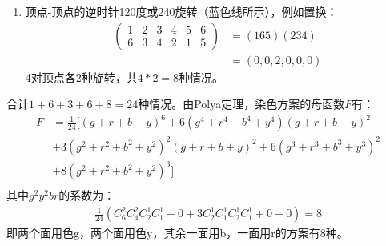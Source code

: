 \begin{solution}
\begin{enumerate}
\begin{align*}
\begin{matrix}
               1 & 2 & 3 & 4 & 5 & 6\\
               6 & 4 & 5 & 2 & 3 & 1
            \end{matrix}
            \right) &= (16)(24)(35) \\
            &= (0,3,0,0,0,0)
      \end{align*}
      6对棱，共$6$种情况。
      \item 顶点-顶点的逆时针120度或240旋转（蓝色线所示），例如置换：
      \begin{align*}
         \left(
            \begin{matrix}
               1 & 2 & 3 & 4 & 5 & 6\\
               6 & 3 & 4 & 2 & 1 & 5
            \end{matrix}
            \right) &= (165)(234) \\
            &= (0,0,2,0,0,0)
      \end{align*}
      4对顶点各2种旋转，共$4*2=8$种情况。
   \end{enumerate}
   合计$1+6+3+6+8=24$种情况。由Polya定理，染色方案的母函数$F$有：
   \begin{align*}
      F&=\frac{1}{24}[(g+r+b+y)^6+6(g^4+r^4+b^4+y^4)(g+r+b+y)^2\\
      &+3(g^2+r^2+b^2+y^2)^2(g+r+b+y)^2+6(g^3+r^3+b^3+y^3)^2\\
      &+8(g^2+r^2+b^2+y^2)^3]\\
   \end{align*}
   其中$g^2y^2br$的系数为：
   \begin{align*}
      \frac{1}{24}\left(C_6^2C_4^2C_2^1C_1^1+0+3C_2^1C_1^1C_2^1C_1^1+0+0\right) = 8
   \end{align*}
   即两个面用色g，两个面用色y，其余一面用b，一面用r的方案有8种。
\end{solution}